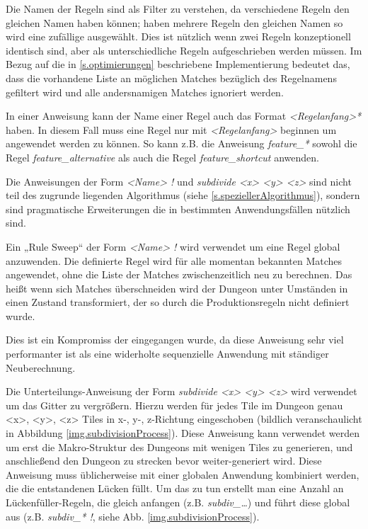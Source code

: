 Die Namen der Regeln sind als Filter zu verstehen, da verschiedene Regeln den gleichen Namen haben können; haben mehrere Regeln den gleichen Namen so wird eine zufällige ausgewählt. Dies ist nützlich wenn zwei Regeln konzeptionell identisch sind, aber als unterschiedliche Regeln aufgeschrieben werden müssen. Im Bezug auf die in \ref{s.optimierungen} beschriebene Implementierung bedeutet das, dass die vorhandene Liste an möglichen Matches bezüglich des Regelnamens gefiltert wird und alle andersnamigen Matches ignoriert werden. 

In einer Anweisung kann der Name einer Regel auch das Format \textit{<Regelanfang>*} haben. In diesem Fall muss eine Regel nur mit \textit{<Regelanfang>} beginnen um angewendet werden zu können. So kann z.B. die Anweisung \textit{feature\_*} sowohl die Regel \textit{feature\_alternative} als auch die Regel \textit{feature\_shortcut} anwenden.

Die Anweisungen der Form \textit{<Name> !} und \textit{subdivide <x> <y> <z>} sind nicht teil des zugrunde liegenden Algorithmus (siehe \ref{s.speziellerAlgorithmus}), sondern sind pragmatische Erweiterungen die in bestimmten Anwendungsfällen nützlich sind.

Ein „Rule Sweep“ der Form \textit{<Name> !} wird verwendet um eine Regel global anzuwenden. Die definierte Regel wird für alle momentan bekannten Matches angewendet, ohne die Liste der Matches zwischenzeitlich neu zu berechnen. Das heißt wenn sich Matches überschneiden wird der Dungeon unter Umständen in einen Zustand transformiert, der so durch die Produktionsregeln nicht definiert wurde. 

Dies ist ein Kompromiss der eingegangen wurde, da diese Anweisung sehr viel performanter ist als eine widerholte sequenzielle Anwendung mit ständiger Neuberechnung. 


Die Unterteilungs-Anweisung der Form \textit{subdivide <x> <y> <z>} wird verwendet um das Gitter zu vergrößern. Hierzu werden für jedes Tile im Dungeon genau <x>, <y>, <z> Tiles in x-, y-, z-Richtung eingeschoben (bildlich veranschaulicht in Abbildung \ref{img.subdivisionProcess}). Diese Anweisung kann verwendet werden um erst die Makro-Struktur des Dungeons mit wenigen Tiles zu generieren, und anschließend den Dungeon zu strecken bevor weiter-generiert wird. 
Diese Anweisung muss üblicherweise mit einer globalen Anwendung kombiniert werden, die die entstandenen Lücken füllt. Um das zu tun erstellt man eine Anzahl an Lückenfüller-Regeln, die gleich anfangen (z.B. \textit{subdiv\_\dots}) und führt diese global aus (z.B. \textit{subdiv\_* !}, siehe  Abb. \ref{img.subdivisionProcess}). 

